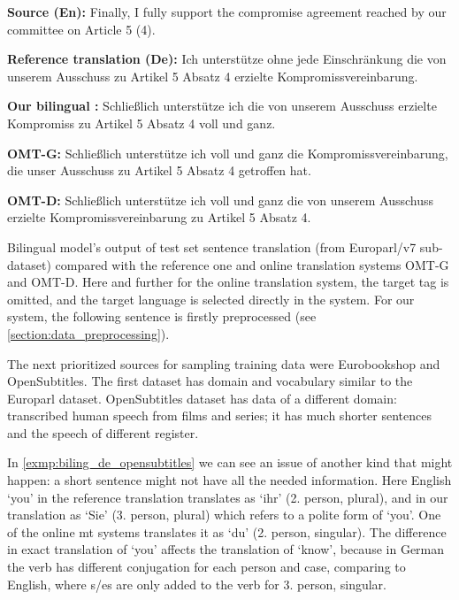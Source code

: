 \vspace{\baselineskip}
\begin{minipage}[t]{0.9\textwidth}

\textbf{Source (En):}   Finally, I fully support the compromise agreement reached by our committee on Article 5 (4).

\textbf{Reference translation (De):}
Ich unterstütze ohne jede Einschränkung die von unserem Ausschuss
zu Artikel 5 Absatz 4 erzielte Kompromissvereinbarung.

\textbf{Our bilingual :}
Schließlich unterstütze ich die von unserem Ausschuss erzielte
Kompromiss zu Artikel 5 Absatz 4 voll und ganz.

\textbf{OMT-G:}
Schließlich unterstütze ich voll und ganz die Kompromissvereinbarung,
die unser Ausschuss zu Artikel 5 Absatz 4 getroffen hat.

\textbf{OMT-D:}
Schließlich unterstütze ich voll und ganz die von unserem Ausschuss
erzielte Kompromissvereinbarung zu Artikel 5 Absatz 4.

	\begin{exmp}
	Bilingual  model's output of test set sentence
	translation (from Europarl/v7 sub-dataset)
	compared with the reference one and online
	translation systems OMT-G and OMT-D.
	Here and further for the online translation system, the target
	tag is omitted, and the target language is selected directly
	in the system.
	For our system, the following sentence is firstly preprocessed
	(see \cref{section:data_preprocessing}).
	\label{exmp:biling_de_europarl}
	\end{exmp}

\end{minipage}
\vspace{\baselineskip}


The next prioritized sources for sampling training data were
Eurobookshop and OpenSubtitles.
The first dataset has domain and vocabulary similar to the Europarl dataset.
OpenSubtitles dataset has data of a different domain:
transcribed human speech from films and series;
it has much shorter sentences and the speech of different register.

In \cref{exmp:biling_de_opensubtitles} we can see an issue of another kind
that might happen: a short sentence might not have all
the needed information. Here English `you' in the reference translation
translates as `ihr' (2. person, plural), and in our translation
as `Sie' (3. person, plural) which refers to a polite form of `you'.
One of the online \acrshort{mt} systems translates it as
`du' (2. person, singular).
The difference in exact translation of `you' affects the translation of
`know', because in German the verb has different conjugation for each
person and case, comparing to English, where s/es are only added
to the verb for 3. person, singular.

